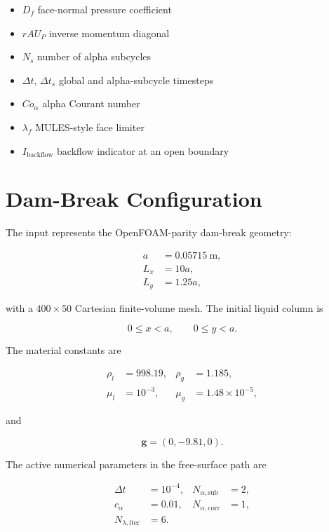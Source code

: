 \documentclass[11pt]{article}
\begin{document}
\begin{itemize}[leftmargin=2.5em]
  \item \(D_f\) face-normal pressure coefficient
  \item \(rAU_P\) inverse momentum diagonal
  \item \(N_s\) number of alpha subcycles
  \item \(\Delta t\), \(\Delta t_s\) global and alpha-subcycle timesteps
  \item \(Co_\alpha\) alpha Courant number
  \item \(\lambda_f\) MULES-style face limiter
  \item \(I_{\mathrm{backflow}}\) backflow indicator at an open boundary
\end{itemize}

\section{Dam-Break Configuration}

The input represents the OpenFOAM-parity dam-break geometry:

\begin{align}
  a &= 0.05715\ \mathrm{m}, \\
  L_x &= 10a, \\
  L_y &= 1.25a,
\end{align}

with a \(400\times 50\) Cartesian finite-volume mesh.  The initial liquid column
is

\begin{equation}
  0 \le x < a,
  \qquad
  0 \le y < a.
\end{equation}

The material constants are

\begin{align}
  \rho_l &= 998.19,
  &
  \rho_g &= 1.185, \\
  \mu_l &= 10^{-3},
  &
  \mu_g &= 1.48\times 10^{-5},
\end{align}

and

\begin{equation}
  \mathbf{g}=(0,-9.81,0).
\end{equation}

The active numerical parameters in the free-surface path are

\begin{align}
  \Delta t &= 10^{-4}, &
  N_{\alpha,\mathrm{sub}} &= 2, \\
  c_\alpha &= 0.01, &
  N_{\alpha,\mathrm{corr}} &= 1, \\
  N_{\lambda,\mathrm{iter}} &= 6.
\end{align}
\end{document}
